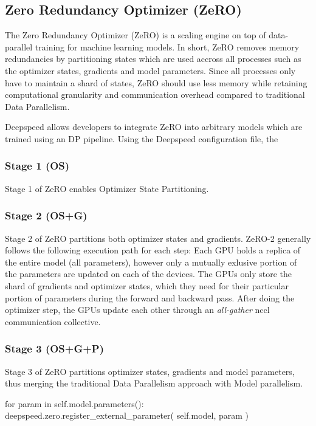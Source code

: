 \subsection{Zero Redundancy Optimizer (ZeRO)}

The Zero Redundancy Optimizer (ZeRO) is a scaling engine on top of data-parallel training for 
machine learning models. In short, ZeRO removes memory redundancies by partitioning states which 
are used accross all processes such as the optimizer states, gradients and model parameters. 
Since all processes only have to maintain a shard of states, ZeRO should use less memory while 
retaining computational granularity and communication overhead compared to traditional Data 
Parallelism.

Deepspeed allows developers to integrate ZeRO into arbitrary models which are trained using an 
DP pipeline. Using the Deepspeed configuration file, the 

\subsubsection{Stage 1 (OS)}

Stage 1 of ZeRO enables Optimizer State Partitioning. 

\subsubsection{Stage 2 (OS+G)}

Stage 2 of ZeRO partitions both optimizer states and gradients. ZeRO-2 generally follows the following 
execution path for each step: Each GPU holds a replica of the entire model (all parameters), however 
only a mutually exlusive portion of the parameters are updated on each of the devices. The GPUs only store 
the shard of gradients and optimizer states, which they need for their particular portion of parameters 
during the forward and backward pass. After doing the optimizer step, the GPUs update each other through 
an \textit{all-gather} nccl communication collective. 

\subsubsection{Stage 3 (OS+G+P)}

Stage 3 of ZeRO partitions optimizer states, gradients and model parameters, thus merging the 
traditional Data Parallelism approach with Model parallelism.

\begin{python}
for param in self.model.parameters():
    deepspeed.zero.register_external_parameter(
        self.model, param
    )
\end{python}


